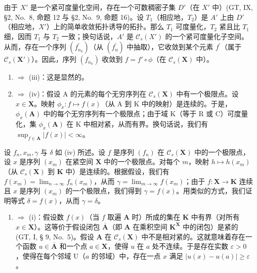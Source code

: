 由于 \(X'\) 是一个紧可度量化空间，存在一个可数稠密子集 \(D'\)（在 \(X'\) 中）(GT, IX, §2, No.~8, 命题 12 与 §2, No.~9, 命题 16)。设 \(T_{1}\)（相应地，\(T_{2}\)）是 \(A'\) 上由 \(D'\)（相应地，\(X'\)）上的简单收敛拓扑诱导的拓扑。那么 \(T_{1}\) 可度量化，\(T_{2}\) 紧且比 \(T_{1}\) 细，因而 \(T_{1}\) 与 \(T_{2}\) 一致；换句话说，\(A'\) 是 \(\mathcal{C}_{s}(X')\) 的一个紧可度量化子空间。从而，存在一个序列 \((f_{n_k}^{\prime})\)（从 \((f_n^{\prime})\) 中抽取），它收敛到某个元素 \(f^{\prime}\)（属于 \(\mathcal{C}_s(\mathbf{X}')\)）。因此，序列 \((f_{n_k})\) 收敛到 \(f = f' \circ \phi\)（在 \(\mathcal{C}_s(\mathbf{X})\) 中）。

\begin{enumerate}
\def\labelenumi{(\roman{enumi})}
\setcounter{enumi}{1}
\item
  \(\Rightarrow\) (iii)：这是显然的。
\item
  \(\Rightarrow\) (iv)：假设 A 的元素的每个无穷序列在 \(\mathcal{C}_s(\mathbf{X})\) 中有一个极限点。设 \(x \in \mathbf{X}\)。映射 \(\phi_x: f \mapsto f(x)\)（从 A 到 K 中的映射）是连续的。于是，\(\phi_x(\mathbf{A})\) 中的每个无穷序列有一个极限点；由于域 K（等于 R 或 C）可度量化，集 \(\phi_x(\mathbf{A})\) 在 K 中相对紧，从而有界。换句话说，我们有 \(\sup_{f \in \mathbf{A}} |f(x)| < \infty\)。
\end{enumerate}

设 \(f_n, x_m, \gamma\) 与 \(\delta\) 如 (iv) 所述。设 \(f\) 是序列 \((f_n)\) 在 \(\mathcal{C}_s(\mathbf{X})\) 中的一个极限点，设 \(x\) 是序列 \((x_m)\) 在紧空间 \(\mathbf{X}\) 中的一个极限点。对每个 \(m\)，映射 \(h \mapsto h(x_m)\)（从 \(\mathcal{C}_s(\mathbf{X})\) 到 \(\mathbf{K}\) 中）是连续的。根据假设，我们有 \(f(x_m) = \lim_{n \to \infty} f_n(x_m)\)，从而 \(\gamma = \lim_{m \to \infty} f(x_m)\)；由于 \(f: \mathbf{X} \to \mathbf{K}\) 连续且 \(x\) 是序列 \((x_m)\) 的一个极限点，我们得到 \(\gamma = f(x)\)。用类似的方式，我们证明等式 \(\delta = f(x)\)，从而 \(\gamma = \delta\)。

\begin{enumerate}
\def\labelenumi{(\roman{enumi})}
\setcounter{enumi}{3}
\tightlist
\item
  \(\Rightarrow\) (i)：假设数 \(f(x)\)（当 \(f\) 取遍 \(\mathbf{A}\) 时）所成的集在 \(\mathbf{K}\) 中有界（对所有 \(x\in \mathbf{X}\)）。这等价于假设闭包 \(\overline{\mathbf{A}}\)（即 \(\mathbf{A}\) 在乘积空间 \(\mathbf{K}^{\mathbf{X}}\) 中的闭包）是紧的 (GT, I, § 9, No.~5)。假设 \(\mathbf{A}\) 在 \(\mathcal{C}_s(\mathbf{X})\) 中不是相对紧的。这就意味着存在一个函数 \(u\in \overline{\mathbf{A}}\) 和一个点 \(a\in \mathbf{X}\)，使得 \(u\) 在 \(a\) 处不连续。于是存在实数 \(\varepsilon >0\)，使得在每个邻域 \(\mathrm{U}\)（\(a\) 的邻域）中，存在一点 \(x\) 满足 \(|u(x) - u(a)|\geqslant \varepsilon\)。
\end{enumerate}

